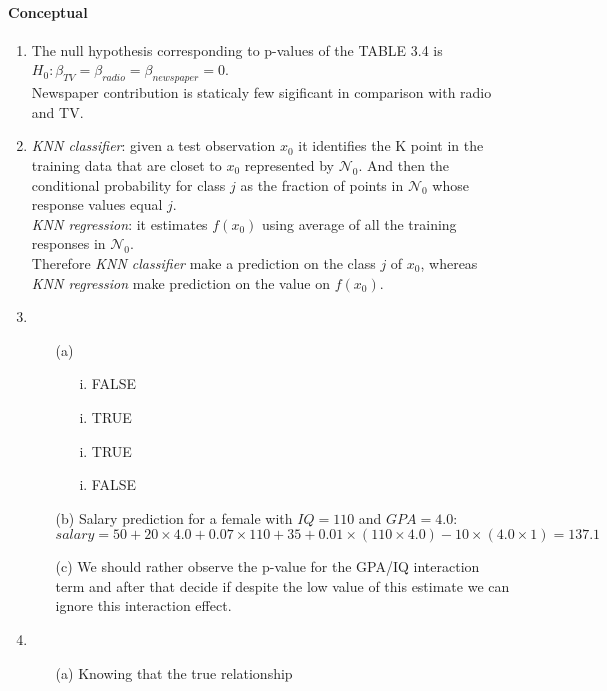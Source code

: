 \paragraph{Conceptual}
\begin{enumerate}
 	\item The null hypothesis corresponding to p-values of the 
		TABLE 3.4 is\\\emph{$H_{0}:\beta_{TV}=\beta_{radio}=
		\beta_{newspaper}=0$}.\\Newspaper contribution is 
		staticaly few sigificant in comparison with radio and
		TV.
	\item \emph{KNN classifier}: given a test observation $x_{0}$
		it identifies the K point in the training data that are
		closet to $x_{0}$ represented by $\mathcal{N}_{0}$.
		And then the conditional probability for class $j$ as
		the fraction of points in $\mathcal{N}_{0}$ whose
		response values equal $j$.\\\emph{KNN regression}:
		it estimates $f\left(x_{0}\right)$ using average of all
		the training responses in $\mathcal{N}_{0}$.\\Therefore
		\emph{KNN classifier} make a prediction on the class 
		$j$ of $x_{0}$, whereas \emph{KNN regression} make 
		prediction on the value on $f\left(x_{0}\right)$. 
	\item 
		\begin{itemize}
			\item[(a)]
				\begin{itemize}
					\item[i.] FALSE
					\item[i.] TRUE
					\item[i.] TRUE
					\item[i.] FALSE
				\end{itemize}
			\item[(b)] Salary prediction for a female with
				$IQ=110$ and $GPA=4.0$:\\
				$salary=50+20\times 4.0+0.07\times 110
				+35+0.01\times(110\times4.0)-10\times
				(4.0\times 1)=137.1$
			\item[(c)] We should rather observe the p-value
				for the GPA/IQ interaction term and
				after that decide if despite the low
				value of this estimate we can ignore
				this interaction effect.
		\end{itemize}
	\item 
		\begin{itemize}	
			\item[(a)] Knowing that the true relationship 

\end{itemize}
\end{enumerate}
